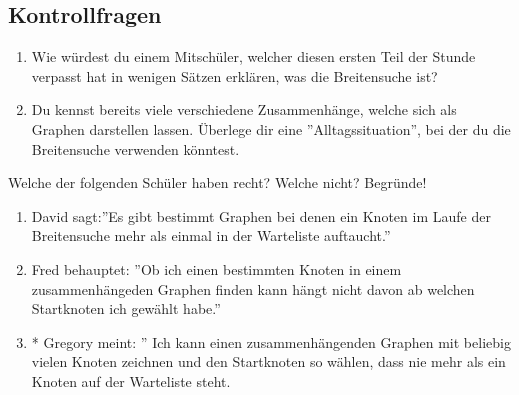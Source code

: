 \subsection{Kontrollfragen}
\begin{enumerate}
    \item Wie würdest du einem Mitschüler, welcher diesen ersten Teil der Stunde verpasst hat in wenigen Sätzen erklären, was die Breitensuche ist?
    \item Du kennst bereits viele verschiedene Zusammenhänge, welche sich als Graphen darstellen lassen. Überlege dir eine ''Alltagssituation'', bei der du die Breitensuche verwenden könntest.
\end{enumerate}
Welche der folgenden Schüler haben recht? Welche nicht? Begründe!
\begin{enumerate}[resume]
    \item David sagt:''Es gibt bestimmt Graphen bei denen ein Knoten im Laufe der Breitensuche mehr als einmal in der Warteliste auftaucht.''
    \item Fred behauptet: ''Ob ich einen bestimmten Knoten in einem zusammenhängeden Graphen finden kann hängt nicht davon ab welchen Startknoten ich gewählt habe.''
    \item * Gregory meint: '' Ich kann einen zusammenhängenden Graphen mit beliebig vielen Knoten zeichnen und den Startknoten so wählen, dass nie mehr als ein Knoten auf der Warteliste steht.
\end{enumerate}

\newpage